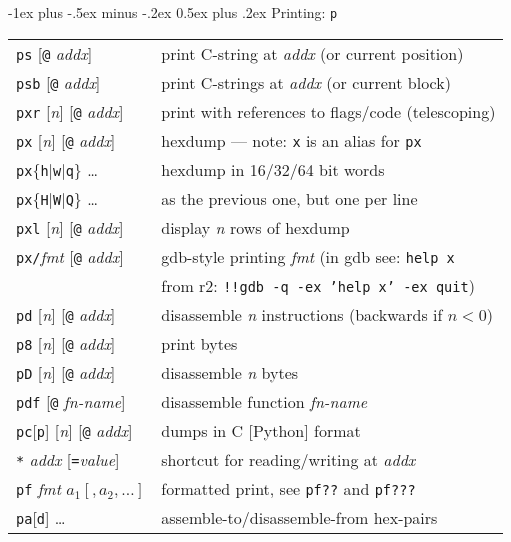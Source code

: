 \documentclass[a4paper,landscape]{article}
\makeatletter
\renewcommand{\section}{\@startsection{section}{1}{0mm}%
                                {-1ex plus -.5ex minus -.2ex}%
                                {0.5ex plus .2ex}%
                                {\normalfont\large\bfseries}}
\makeatother
\begin{document}
\begin{multicols*}{3}
\section{Printing: \texttt{p}}
\begin{tabular}{@{}ll@{}}
\texttt{ps} [\texttt{@} \textit{addx}]& print C-string at \textit{addx} (or current position) \\
\texttt{psb} [\texttt{@} \textit{addx}]& print C-strings at \textit{addx} (or current block) \\
\texttt{pxr} [\textit{n}] [\texttt{@} \textit{addx}] & print with references to flags/code (telescoping) \\
\texttt{px} [\textit{n}] [\texttt{@} \textit{addx}] & hexdump --- note: \texttt{x} is an alias for \texttt{px}\\
\texttt{px}$\{$\texttt{h}$|$\texttt{w}$|$\texttt{q}$\}$ \ldots & hexdump in 16/32/64 bit words \\
\texttt{px}$\{$\texttt{H}$|$\texttt{W}$|$\texttt{Q}$\}$ \ldots & as the previous one, but one per line \\
\texttt{pxl} [\textit{n}] [\texttt{@} \textit{addx}] & display \textit{n} rows of hexdump \\
\texttt{px/}\textit{fmt} [\texttt{@} \textit{addx}] & gdb-style printing \textit{fmt} (in gdb see: \texttt{help x} \\ & from r2: \texttt{!!gdb -q -ex 'help x' -ex quit}) \\
\texttt{pd} [\textit{n}] [\texttt{@} \textit{addx}] & disassemble \textit{n} instructions (backwards if $n<0$) \\
\texttt{p8} [\textit{n}] [\texttt{@} \textit{addx}] & print bytes \\
\texttt{pD} [\textit{n}] [\texttt{@} \textit{addx}] & disassemble \textit{n} bytes \\
\texttt{pdf} [\texttt{@} \textit{fn-name}] & disassemble function \textit{fn-name} \\
\texttt{pc}[\texttt{p}] [\textit{n}] [\texttt{@} \textit{addx}] & dumps in C [Python] format \\
\texttt{*} \textit{addx} [\texttt{=}\textit{value}] & shortcut for reading/writing at \textit{addx} \\
\texttt{pf} \textit{fmt} $a_1 [,a_2,\dots]$ & formatted print, see \texttt{pf??} and \texttt{pf???} \\
\texttt{pa}[\texttt{d}] \ldots & assemble-to/disassemble-from hex-pairs \\
\end{tabular}


\end{multicols*}
\end{document}
